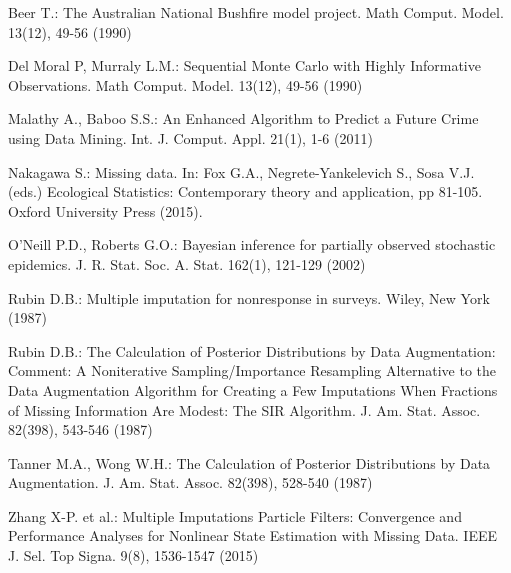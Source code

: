 \begin{thebibliography}{}

Beer T.: The Australian National Bushfire model project. Math Comput. Model. 13(12), 49-56 (1990)

Del Moral P, Murraly L.M.: Sequential Monte Carlo with Highly Informative Observations. Math Comput. Model. 13(12), 49-56 (1990)

Malathy A., Baboo S.S.: An Enhanced Algorithm to Predict a Future Crime using Data Mining. Int. J. Comput. Appl. 21(1), 1-6 (2011)

Nakagawa S.: Missing data. In: Fox G.A., Negrete-Yankelevich S., Sosa V.J. (eds.) Ecological Statistics: Contemporary theory and application, pp 81-105. Oxford University Press (2015). 

O'Neill P.D., Roberts G.O.: Bayesian inference for partially observed stochastic epidemics. J. R. Stat. Soc. A. Stat. 162(1), 121-129 (2002)

Rubin D.B.: Multiple imputation for nonresponse in surveys. Wiley, New York (1987)

Rubin D.B.: The Calculation of Posterior Distributions by Data Augmentation: Comment: A Noniterative Sampling/Importance Resampling Alternative to the Data Augmentation Algorithm for Creating a Few Imputations When Fractions of Missing Information Are Modest: The SIR Algorithm. J. Am. Stat. Assoc. 82(398), 543-546 (1987)

Tanner M.A., Wong W.H.: The Calculation of Posterior Distributions by Data Augmentation. J. Am. Stat. Assoc. 82(398), 528-540 (1987)

Zhang X-P. et al.: Multiple Imputations Particle Filters: Convergence and Performance Analyses for Nonlinear State Estimation with Missing Data. IEEE J. Sel. Top Signa. 9(8), 1536-1547 (2015)

\end{thebibliography}


